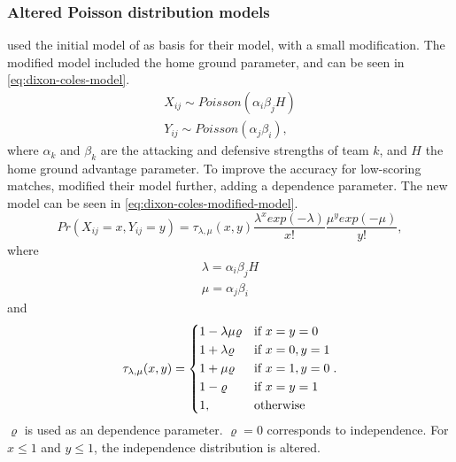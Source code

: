 \subsubsection{Altered Poisson distribution models}

\citet{bib:dixon-coles-1997} used the initial model of \citet{bib:maher-1982} as basis for their model, with a small modification. The modified model included the home ground parameter, and can be seen in \cref{eq:dixon-coles-model}.
\begin{equation}
    \begin{aligned}
        X_{ij} \sim Poisson(\alpha_{i} \beta_{j} H) \\
        Y_{ij} \sim Poisson(\alpha_{j} \beta_{i}),
    \end{aligned}
    \label{eq:dixon-coles-model}
\end{equation}
where $\alpha_{k}$ and $\beta_{k}$ are the attacking and defensive strengths of team $k$, and $H$ the home ground advantage parameter. To improve the accuracy for low-scoring matches, \citet{bib:dixon-coles-1997} modified their model further, adding a dependence parameter. The new model can be seen in \cref{eq:dixon-coles-modified-model}.
\begin{equation}
    Pr(X_{ij} = x, Y_{ij} = y) = \tau_{\lambda, \mu}(x, y) \frac{\lambda^x exp(-\lambda)}{x!} \frac{\mu^y exp(-\mu)}{y!},
    \label{eq:dixon-coles-modified-model}
\end{equation}
where
\begin{equation}
    \begin{aligned}
        \lambda = \alpha_{i} \beta_{j} H \\
        \mu = \alpha_{j} \beta_{i}
    \end{aligned}
\end{equation}
and
\begin{equation}
    \tau_{\lambda, \mu}(x, y) =
    \begin{dcases}
        1 - \lambda \mu \varrho & \text{if } x = y = 0 \\
        1 + \lambda \varrho     & \text{if } x = 0, y = 1 \\
        1 + \mu \varrho         & \text{if } x = 1, y = 0 \\
        1 - \varrho             & \text{if } x = y = 1 \\
        1,                      & \text{otherwise}
    \end{dcases}.
\end{equation}
$\varrho$ is used as an dependence parameter. $\varrho = 0$ corresponds to independence. For $x \leq 1$ and $y \leq 1$, the independence distribution is altered.


